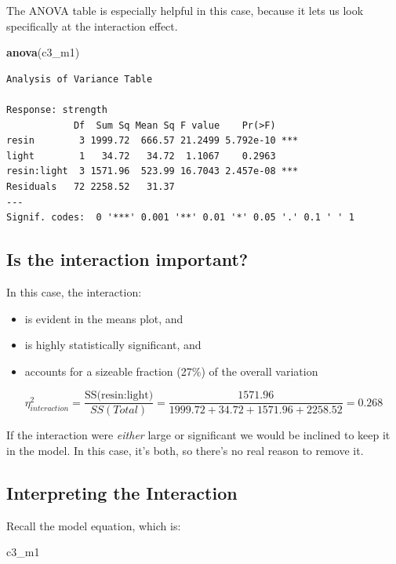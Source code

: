 \documentclass[]{book}
\newenvironment{Shaded}{\begin{snugshade}}{\end{snugshade}}
\newcommand{\KeywordTok}[1]{\textcolor[rgb]{0.13,0.29,0.53}{\textbf{#1}}}
\newcommand{\NormalTok}[1]{#1}
\providecommand{\tightlist}{%
  \setlength{\itemsep}{0pt}\setlength{\parskip}{0pt}}
\theoremstyle{definition}
\theoremstyle{definition}
\theoremstyle{definition}
\theoremstyle{remark}
\begin{document}
The ANOVA table is especially helpful in this case, because it lets us
look specifically at the interaction effect.

\begin{Shaded}
\begin{Highlighting}[]
\KeywordTok{anova}\NormalTok{(c3_m1)}
\end{Highlighting}
\end{Shaded}

\begin{verbatim}
Analysis of Variance Table

Response: strength
            Df  Sum Sq Mean Sq F value    Pr(>F)    
resin        3 1999.72  666.57 21.2499 5.792e-10 ***
light        1   34.72   34.72  1.1067    0.2963    
resin:light  3 1571.96  523.99 16.7043 2.457e-08 ***
Residuals   72 2258.52   31.37                      
---
Signif. codes:  0 '***' 0.001 '**' 0.01 '*' 0.05 '.' 0.1 ' ' 1
\end{verbatim}

\subsection{Is the interaction
important?}\label{is-the-interaction-important}

In this case, the interaction:

\begin{itemize}
\tightlist
\item
  is evident in the means plot, and
\item
  is highly statistically significant, and
\item
  accounts for a sizeable fraction (27\%) of the overall variation
\end{itemize}

\[ 
\eta^2_{interaction} = \frac{\mbox{SS(resin:light)}}{SS(Total)}
= \frac{1571.96}{1999.72 + 34.72 + 1571.96 + 2258.52} = 0.268
\]

If the interaction were \emph{either} large or significant we would be
inclined to keep it in the model. In this case, it's both, so there's no
real reason to remove it.

\subsection{Interpreting the
Interaction}\label{interpreting-the-interaction}

Recall the model equation, which is:

\begin{Shaded}
\begin{Highlighting}[]
\NormalTok{c3_m1}
\end{Highlighting}
\end{Shaded}
\end{document}
